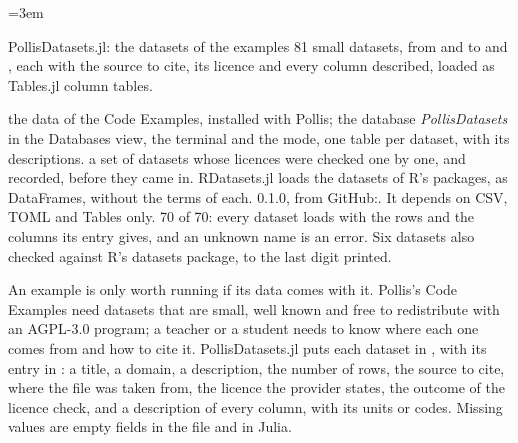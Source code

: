 \emergencystretch=3em

  {PollisDatasets.jl: the datasets of the examples}
  {81 small datasets, from  and  to  and , each with the source to
   cite, its licence and every column described, loaded as Tables.jl column tables.}

\factsheet
  {the data of the Code Examples, installed with Pollis; the database \emph{PollisDatasets} in the Databases view,
   the  terminal and the  mode, one table per dataset, with its descriptions.}
  {a set of datasets whose licences were checked one by one, and recorded, before they came in. RDatasets.jl
   loads the datasets of R's packages, as DataFrames, without the terms of each.}
  { 0.1.0, from GitHub:\newline {}.
   It depends on CSV, TOML and Tables only.}
  {70 of 70: every dataset loads with the rows and the columns its entry gives, and an unknown name is an
   error. Six datasets also checked against R's datasets package, to the last digit printed.}

An example is only worth running if its data comes with it. Pollis's Code Examples need datasets that are small,
well known and free to redistribute with an AGPL-3.0 program; a teacher or a student needs to know where each one
comes from and how to cite it. PollisDatasets.jl puts each dataset in , with its entry in
: a title, a domain, a description, the number of rows, the source to cite, where the file was
taken from, the licence the provider states, the outcome of the licence check, and a description of every column,
with its units or codes. Missing values are empty fields in the file and  in Julia.


